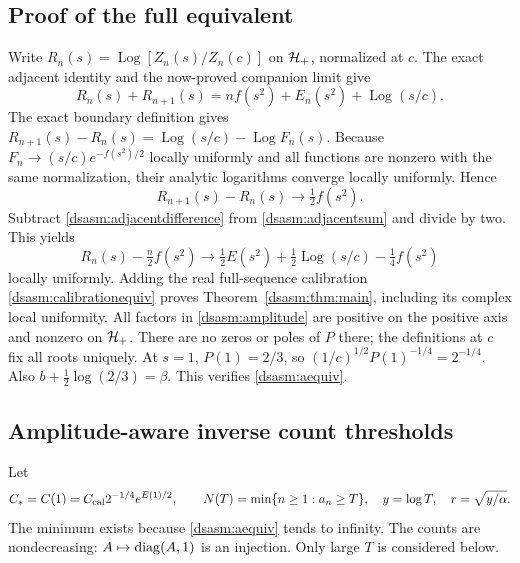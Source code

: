 \documentclass[11pt,letterpaper]{article}
\theoremstyle{remark}\newtheorem{remark}[theorem]{Remark}
\DeclareMathOperator{\Log}{Log}\DeclareMathOperator{\Var}{Var}
\begin{document}
\subsection{Proof of the full equivalent}
Write $R_n(s)=\Log[Z_n(s)/Z_n(c)]$ on $\mathcal H_+$, normalized at $c$.
The exact adjacent identity and the now-proved companion limit give
\begin{equation}\label{dsasm:adjacentsum}
 R_n(s)+R_{n+1}(s)=nf(s^2)+E_n(s^2)+\Log(s/c).
\end{equation}
The exact boundary definition gives
$R_{n+1}(s)-R_n(s)=\Log(s/c)-\Log F_n(s)$.
Because $F_n\to(s/c)e^{-f(s^2)/2}$ locally uniformly and all functions
are nonzero with the same normalization, their analytic logarithms
converge locally uniformly. Hence
\begin{equation}\label{dsasm:adjacentdifference}
 R_{n+1}(s)-R_n(s)\longrightarrow\tfrac12f(s^2).
\end{equation}
Subtract \eqref{dsasm:adjacentdifference} from \eqref{dsasm:adjacentsum} and divide
by two. This yields
\begin{equation}\label{dsasm:Rlimit}
 R_n(s)-\tfrac n2f(s^2)
 \longrightarrow\tfrac12E(s^2)+\tfrac12\Log(s/c)-\tfrac14f(s^2)
\end{equation}
locally uniformly. Adding the real full-sequence calibration
\eqref{dsasm:calibrationequiv} proves Theorem~\ref{dsasm:thm:main}, including its
complex local uniformity. All factors in \eqref{dsasm:amplitude} are positive
on the positive axis and nonzero on $\mathcal H_+$. There are no zeros or
poles of $P$ there; the definitions at $c$ fix all roots uniquely.
At $s=1$, $P(1)=2/3$, so
$(1/c)^{1/2}P(1)^{-1/4}=2^{-1/4}$. Also
$b+\tfrac12\log(2/3)=\beta$. This verifies \eqref{dsasm:aequiv}.

\subsection{Amplitude-aware inverse count thresholds}
Let
\[
 C_*=C(1)=C_{\rm cal}2^{-1/4}e^{E(1)/2},\qquad
 N(T)=\min\{n\ge1:a_n\ge T\},\quad y=\log T,\quad r=\sqrt{y/\alpha}.
\]
The minimum exists because \eqref{dsasm:aequiv} tends to infinity.
The counts are nondecreasing: $A\mapsto\operatorname{diag}(A,1)$ is an injection.
Only large $T$ is considered below.
\end{document}
